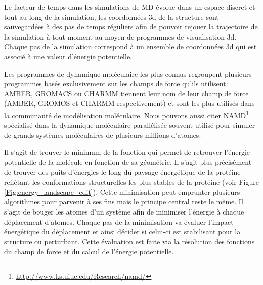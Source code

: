 
Le facteur de temps dans les simulations de MD évolue dans un espace discret et tout au long de la simulation, les coordonnées 3d de la structure sont sauvegardées à des pas de temps réguliers afin de pouvoir rejouer la trajectoire de la simulation à tout moment au moyen de programmes de visualisation 3d. Chaque pas de la simulation correspond à un ensemble de coordonnées 3d qui est associé à une valeur d'énergie potentielle.

Les programmes de dynamique moléculaire les plus connus regroupent plusieurs programmes basés exclusivement sur les champs de force qu'ils utilisent: AMBER, GROMACS ou CHARMM tiennent leur nom de leur champ de force (AMBER, GROMOS et CHARMM respectivement) et sont les plus utilisés dans la communauté de modélisation moléculaire. Nous pouvons aussi citer NAMD\footnote{\url{http://www.ks.uiuc.edu/Research/namd/}} \cite{phillips2005scalable} spécialisé dans la dynamique moléculaire parallélisée souvent utilisé pour simuler de grands systèmes moléculaires de plusieurs millions d'atomes.


Il s'agit de trouver le minimum de la fonction qui permet de retrouver l'énergie potentielle de la molécule en fonction de sa géométrie. Il s'agit plus précisément de trouver des puits d'énergies le long du paysage énergétique de la protéine reflétant les conformations structurelles les plus stables de la protéine (voir Figure \ref{Fig:energy_landscape_edit}). Cette minimisation peut emprunter plusieurs algorithmes pour parvenir à ses fins mais le principe central reste le même. Il s'agit de bouger les atomes d'un système afin de minimiser l'énergie à chaque déplacement d'atomes. Chaque pas de la minimisation va évaluer l'impact énergétique du déplacement et ainsi décider si celui-ci est stabilisant pour la structure ou perturbant. Cette évaluation est faite via la résolution des fonctions du champ de force et du calcul de l'énergie potentielle.


